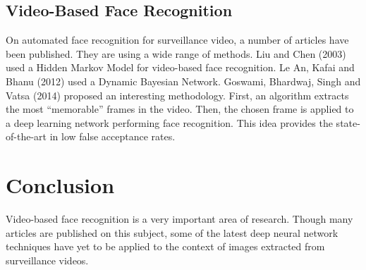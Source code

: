 \FloatBarrier

\subsection{Video-Based Face Recognition}

On automated face recognition for surveillance video, a number of articles have been published. They are using a wide range of methods. Liu and Chen (2003) used a Hidden Markov Model for video-based face recognition. Le An, Kafai and Bhanu (2012) used a Dynamic Bayesian Network. Goswami, Bhardwaj, Singh and Vatsa (2014) proposed an interesting methodology. First, an algorithm extracts the most \enquote{memorable} frames in the video. Then, the chosen frame is applied to a deep learning network performing face recognition. This idea provides the state-of-the-art in low false acceptance rates.

\section{Conclusion}

Video-based face recognition is a very important area of research. Though many articles are published on this subject, some of the latest deep neural network techniques have yet to be applied to the context of images extracted from surveillance videos.